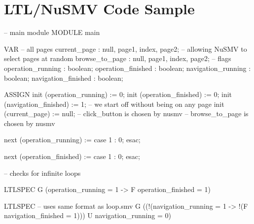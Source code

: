 \chapter{LTL/NuSMV Code Sample}

\begin{ltlcode}
-- main module
MODULE main

VAR
  -- all pages
  current_page : {null, page1, index, page2};
  -- allowing NuSMV to select pages at random
  browse_to_page : {null, page1, index, page2};
  -- flags
  operation_running : boolean;
  operation_finished : boolean;
  navigation_running : boolean;
  navigation_finished : boolean;

ASSIGN
  init (operation_running) := 0;
  init (operation_finished) := 0;
  init (navigation_finished) := 1;
  -- we start off without being on any page
  init (current_page) := null;
  -- click_button is chosen by nusmv
  -- browse_to_page is chosen by nusmv
  
  next (operation_running) := case
    1 : 0;
  esac;
  
  next (operation_finished) := case
    1 : 0;
  esac;

-- checks for infinite loops

LTLSPEC
  G (operation_running = 1 -> F operation_finished = 1) 
  
LTLSPEC
  -- uses same format as loop.smv
  G ((!(navigation_running = 1 -> !(F navigation_finished = 1))) U navigation_running = 0)
\end{ltlcode}
